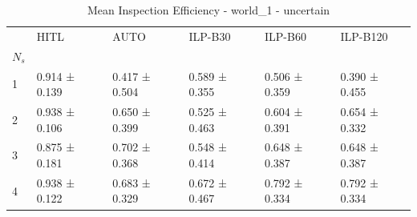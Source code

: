 \begin{table}
\caption{Mean Inspection Efficiency - world_1 - uncertain}
\label{tab:inspection_efficiency_uncertain}
\begin{tabular}{llllll}
\toprule
 & HITL & AUTO & ILP-B30 & ILP-B60 & ILP-B120 \\
$N_s$ &  &  &  &  &  \\
\midrule
1 & 0.914 ± 0.139 & 0.417 ± 0.504 & 0.589 ± 0.355 & 0.506 ± 0.359 & 0.390 ± 0.455 \\
2 & 0.938 ± 0.106 & 0.650 ± 0.399 & 0.525 ± 0.463 & 0.604 ± 0.391 & 0.654 ± 0.332 \\
3 & 0.875 ± 0.181 & 0.702 ± 0.368 & 0.548 ± 0.414 & 0.648 ± 0.387 & 0.648 ± 0.387 \\
4 & 0.938 ± 0.122 & 0.683 ± 0.329 & 0.672 ± 0.467 & 0.792 ± 0.334 & 0.792 ± 0.334 \\
\bottomrule
\end{tabular}
\end{table}
